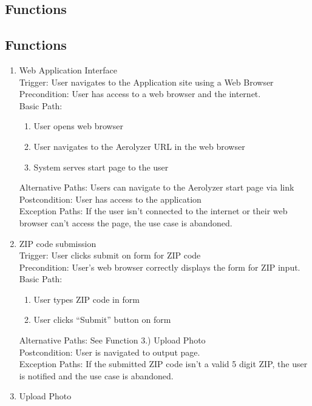 \documentclass[journal,10pt,draftclsnofoot,onecolumn]{IEEEtran}
\begin{document}
\begin{singlespace}
\clearpage

\section{Functions}
\subsection{Functions}
\begin{enumerate}
\item Web Application Interface\\
Trigger: User navigates to the Application site using a Web Browser\\
Precondition: User has access to a web browser and the internet.\\
Basic Path:\begin{enumerate}
\item User opens web browser
\item User navigates to the Aerolyzer URL in the web browser
\item System serves start page to the user
\end{enumerate}
Alternative Paths: Users can navigate to the Aerolyzer start page via link\\
Postcondition: User has access to the application\\
Exception Paths: If the user isn't connected to the internet or their web browser can't access the page, the use case is abandoned.
\\
\item ZIP code submission\\
Trigger: User clicks submit on form for ZIP code\\
Precondition: User's web browser correctly displays the form for ZIP input.\\
Basic Path:\begin{enumerate}
\item User types ZIP code in form
\item User clicks “Submit” button on form
\end{enumerate}
Alternative Paths: See Function 3.) Upload Photo\\
Postcondition: User is navigated to output page.\\
Exception Paths: If the submitted ZIP code isn't a valid 5 digit ZIP, the user is notified and the use case is abandoned.
\\
\item Upload Photo\\

\end{enumerate}
\end{singlespace}
\end{document}
